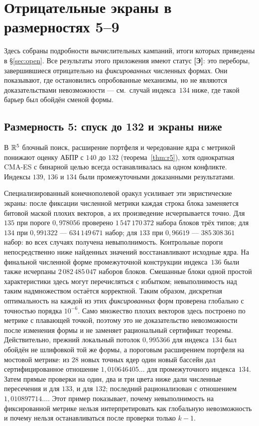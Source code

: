 \section{Отрицательные экраны в размерностях 5--9}\label{app:screens}

Здесь собраны подробности вычислительных кампаний, итоги которых приведены в
\S\ref{sec:open}. Все результаты этого приложения имеют статус \textbf{[Э]}:
это переборы, завершившиеся отрицательно на \emph{фиксированных} численных
формах. Они показывают, где остановились опробованные механизмы, но не
являются доказательствами невозможности --- см.\ случай индекса~$134$ ниже,
где такой барьер был обойдён сменой формы.

\subsection{Размерность 5: спуск до 132 и экраны ниже}\label{app:d5}

В $\mathbb{R}^5$ блочный поиск, расширение портфеля и чередование ядра с метрикой
понижают оценку АБПР с $140$ до $132$ (теорема~\ref{thm:r5}), хотя однократная
CMA-ES с бинарной целью всегда останавливалась на одном конфликте.
Индексы $139$, $136$ и $134$ были промежуточными доказанными результатами.

Специализированный конечнополевой оракул усиливает эти эвристические экраны:
после фиксации численной метрики каждая строка блока заменяется битовой маской
плохих векторов, а их произведение исчерпывается точно. Для $135$ при пороге
$0{,}978056$ проверено $1\,547\,170\,372$ набора блоков трёх типов;
для $134$ при $0{,}991322$ --- $634\,149\,671$ набор; для $133$ при
$0{,}96619$ --- $385\,308\,361$ набор: во всех случаях получена невыполнимость.
Контрольные пороги непосредственно ниже найденных значений восстанавливают
исходные ядра. На финальной численной форме промежуточной конструкции
индекса~$136$ были также исчерпаны $2\,082\,485\,047$ наборов блоков.
Смешанные блоки одной простой характеристики здесь могут перечисляться с
избытком; невыполнимость над таким надмножеством остаётся корректной. Таким образом,
дискретная оптимальность на каждой из этих \emph{фиксированных} форм проверена
глобально с точностью порядка $10^{-6}$.
Само множество плохих векторов здесь построено по метрике с плавающей точкой, поэтому это
не доказательство невозможности после изменения формы и не заменяет
рациональный сертификат теоремы. Действительно, прежний локальный потолок
$0{,}995366$ для индекса~$134$ был обойдён не шлифовкой той же формы, а
пороговым расширением портфеля на мостовой метрике: из $28$ новых точных
ядер один новый бассейн дал сертифицированное отношение
$1{,}010646405\ldots$ для промежуточного индекса~$134$. Затем прямые проверки
на один, два и три цвета ниже дали численные пересечения и для $133$, и для
$132$; последний рационализован с отношением
$1{,}010897714\ldots$. Этот пример показывает, почему невыполнимость на фиксированной метрике нельзя интерпретировать как глобальную невозможность и почему нельзя
останавливаться после проверки только $k-1$.


